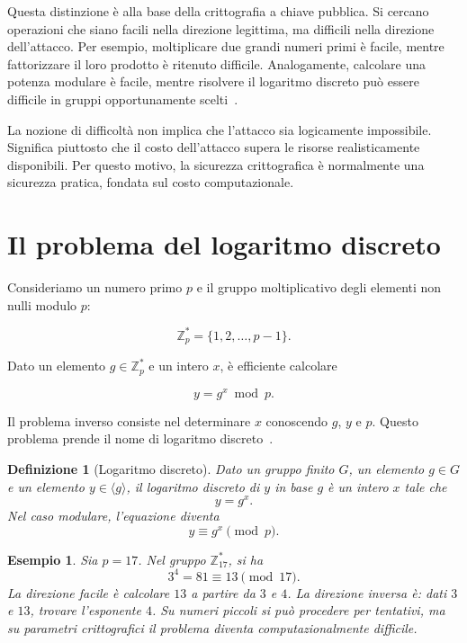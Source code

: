 \documentclass[12pt,a4paper,oneside]{report}
\newtheorem{definition}{Definizione}[chapter]
\newtheorem{example}{Esempio}[chapter]
\begin{document}
Questa distinzione è alla base della crittografia a chiave pubblica. Si cercano operazioni che siano facili nella direzione legittima, ma difficili nella direzione dell'attacco. Per esempio, moltiplicare due grandi numeri primi è facile, mentre fattorizzare il loro prodotto è ritenuto difficile. Analogamente, calcolare una potenza modulare è facile, mentre risolvere il logaritmo discreto può essere difficile in gruppi opportunamente scelti~\cite{margara_complessita,margara_publickey}.

La nozione di difficoltà non implica che l'attacco sia logicamente impossibile. Significa piuttosto che il costo dell'attacco supera le risorse realisticamente disponibili. Per questo motivo, la sicurezza crittografica è normalmente una sicurezza pratica, fondata sul costo computazionale.

\section{Il problema del logaritmo discreto}

Consideriamo un numero primo \(p\) e il gruppo moltiplicativo degli elementi non nulli modulo \(p\):

\begin{equation}
    \mathbb{Z}_p^\ast = \{1,2,\ldots,p-1\}.
\end{equation}

Dato un elemento \(g \in \mathbb{Z}_p^\ast\) e un intero \(x\), è efficiente calcolare

\begin{equation}
    y = g^x \bmod p.
\end{equation}

Il problema inverso consiste nel determinare \(x\) conoscendo \(g\), \(y\) e \(p\). Questo problema prende il nome di logaritmo discreto~\cite{margara_complessita,margara_dh}.

\begin{definition}[Logaritmo discreto]
Dato un gruppo finito \(G\), un elemento \(g \in G\) e un elemento \(y \in \langle g \rangle\), il logaritmo discreto di \(y\) in base \(g\) è un intero \(x\) tale che
\[
y = g^x.
\]
Nel caso modulare, l'equazione diventa
\[
y \equiv g^x \pmod p.
\]
\end{definition}

\begin{example}
Sia \(p=17\). Nel gruppo \(\mathbb{Z}_{17}^\ast\), si ha
\[
3^4 = 81 \equiv 13 \pmod{17}.
\]
La direzione facile è calcolare \(13\) a partire da \(3\) e \(4\). La direzione inversa è: dati \(3\) e \(13\), trovare l'esponente \(4\). Su numeri piccoli si può procedere per tentativi, ma su parametri crittografici il problema diventa computazionalmente difficile.
\end{example}
\end{document}
